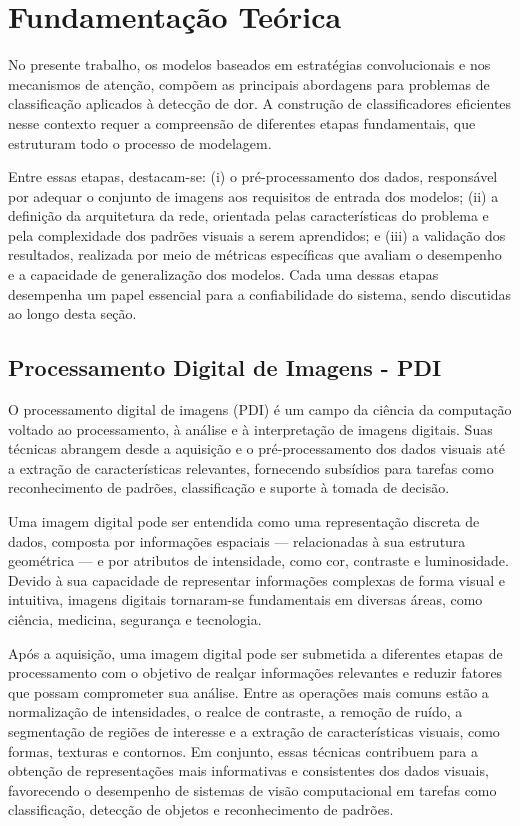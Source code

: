 \chapter[Fundamentação Teórica]{Fundamentação Teórica}

No presente trabalho, os modelos baseados em estratégias convolucionais e nos mecanismos de atenção, compõem as principais abordagens para problemas de classificação aplicados à detecção de dor. A construção de classificadores eficientes nesse contexto requer a compreensão de diferentes etapas fundamentais, que estruturam todo o processo de modelagem.

Entre essas etapas, destacam-se: (i) o pré-processamento dos dados, responsável por adequar o conjunto de imagens aos requisitos de entrada dos modelos; (ii) a definição da arquitetura da rede, orientada pelas características do problema e pela complexidade dos padrões visuais a serem aprendidos; e (iii) a validação dos resultados, realizada por meio de métricas específicas que avaliam o desempenho e a capacidade de generalização dos modelos. Cada uma dessas etapas desempenha um papel essencial para a confiabilidade do sistema, sendo discutidas ao longo desta seção.

\section{Processamento Digital de Imagens - \acs{PDI}}

O processamento digital de imagens (\acs{PDI}) é um campo da ciência da computação voltado ao processamento, à análise e à interpretação de imagens digitais. Suas técnicas abrangem desde a aquisição e o pré-processamento dos dados visuais até a extração de características relevantes, fornecendo subsídios para tarefas como reconhecimento de padrões, classificação e suporte à tomada de decisão.

Uma imagem digital pode ser entendida como uma representação discreta de dados, composta por informações espaciais — relacionadas à sua estrutura geométrica — e por atributos de intensidade, como cor, contraste e luminosidade. Devido à sua capacidade de representar informações complexas de forma visual e intuitiva, imagens digitais tornaram-se fundamentais em diversas áreas, como ciência, medicina, segurança e tecnologia.

Após a aquisição, uma imagem digital pode ser submetida a diferentes etapas de processamento com o objetivo de realçar informações relevantes e reduzir fatores que possam comprometer sua análise. Entre as operações mais comuns estão a normalização de intensidades, o realce de contraste, a remoção de ruído, a segmentação de regiões de interesse e a extração de características visuais, como formas, texturas e contornos. Em conjunto, essas técnicas contribuem para a obtenção de representações mais informativas e consistentes dos dados visuais, favorecendo o desempenho de sistemas de visão computacional em tarefas como classificação, detecção de objetos e reconhecimento de padrões.

